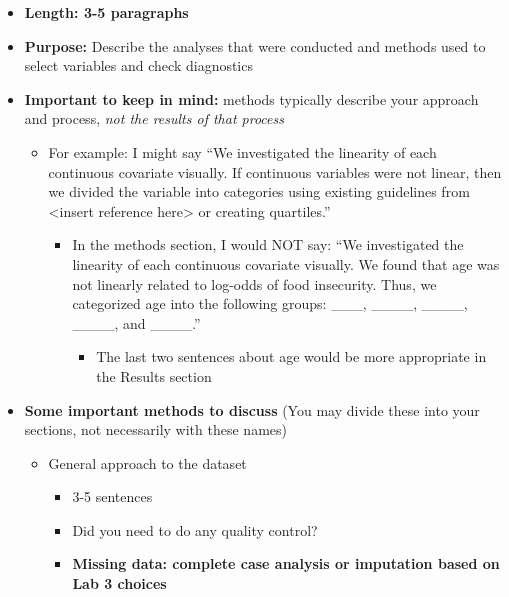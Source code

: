 \documentclass[
  letterpaper,
  DIV=11,
  numbers=noendperiod]{scrartcl}
\providecommand{\tightlist}{%
  \setlength{\itemsep}{0pt}\setlength{\parskip}{0pt}}\usepackage{longtable,booktabs,array}
\begin{document}
\begin{itemize}
\tightlist
\item
  \textbf{Length: 3-5 paragraphs}
\item
  \textbf{Purpose:} Describe the analyses that were conducted and
  methods used to select variables and check diagnostics
\item
  \textbf{Important to keep in mind:} methods typically describe your
  approach and process, \emph{not the results of that process}

  \begin{itemize}
  \tightlist
  \item
    For example: I might say ``We investigated the linearity of each
    continuous covariate visually. If continuous variables were not
    linear, then we divided the variable into categories using existing
    guidelines from \textless insert reference here\textgreater{} or
    creating quartiles.''

    \begin{itemize}
    \tightlist
    \item
      In the methods section, I would NOT say: ``We investigated the
      linearity of each continuous covariate visually. We found that age
      was not linearly related to log-odds of food insecurity. Thus, we
      categorized age into the following groups: \_\_\_, \_\_\_\_,
      \_\_\_\_, \_\_\_\_, and \_\_\_\_.''

      \begin{itemize}
      \tightlist
      \item
        The last two sentences about age would be more appropriate in
        the Results section
      \end{itemize}
    \end{itemize}
  \end{itemize}
\item
  \textbf{Some important methods to discuss} (You may divide these into
  your sections, not necessarily with these names)

  \begin{itemize}
  \tightlist
  \item
    General approach to the dataset

    \begin{itemize}
    \tightlist
    \item
      3-5 sentences
    \item
      Did you need to do any quality control?
    \item
      {\textbf{Missing data: complete case analysis or imputation based
      on Lab 3 choices}}


\end{itemize}
\end{itemize}
\end{itemize}
\end{document}
